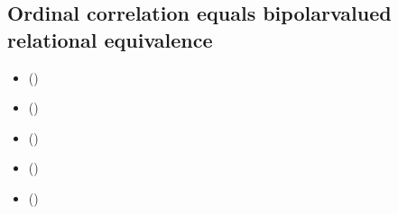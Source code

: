 \documentclass[a4paper,12pt,english]{sphinxhowto}
\begin{document}
\subsection{Ordinal correlation equals bipolar\sphinxhyphen{}valued relational equivalence}
\label{\detokenize{pearls:ordinal-correlation-equals-bipolar-valued-relational-equivalence}}\label{\detokenize{pearls:ordinalcorrelation-tutorial-label}}
\begin{sphinxcontents}
\begin{itemize}
\item {} 
\sphinxAtStartPar
{}\label{\detokenize{pearls:id145}}{\hyperref[\detokenize{pearls:kendall-s-tau-index}]{}} ()

\item {} 
\sphinxAtStartPar
{}\label{\detokenize{pearls:id146}}{\hyperref[\detokenize{pearls:bipolar-valued-relational-equivalence}]{}} ()

\item {} 
\sphinxAtStartPar
{}\label{\detokenize{pearls:id147}}{\hyperref[\detokenize{pearls:fitness-of-ranking-heuristics}]{}} ()

\item {} 
\sphinxAtStartPar
{}\label{\detokenize{pearls:id148}}{\hyperref[\detokenize{pearls:illustrating-preference-divergences}]{}} ()

\item {} 
\sphinxAtStartPar
{}\label{\detokenize{pearls:id149}}{\hyperref[\detokenize{pearls:exploring-the-better-rated-and-the-as-well-as-rated-opinions}]{}} ()

\end{itemize}
\end{sphinxcontents}
\end{document}
